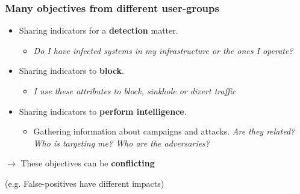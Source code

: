 \begin{frame}
\frametitle{Many objectives from different user-groups}
    \begin{itemize}
        \item Sharing indicators for a {\bf detection} matter.
            \begin{itemize}
                \item \textit{Do I have infected systems in my infrastructure or the ones I operate?}
            \end{itemize}
    \item Sharing indicators to {\bf block}.
            \begin{itemize}
                \item \textit{I use these attributes to block, sinkhole or divert traffic}
            \end{itemize}
    \item Sharing indicators to {\bf perform intelligence}.
            \begin{itemize}
                \item Gathering information about campaigns and attacks. \textit{Are they related? Who is targeting me? Who are the adversaries?}
            \end{itemize}
        \end{itemize}
        
        \vspace{1em}
        \begin{center}
        $\rightarrow$ These objectives can be {\bf conflicting}

        (e.g. False-positives have different impacts)
        \end{center}
    \end{frame}

